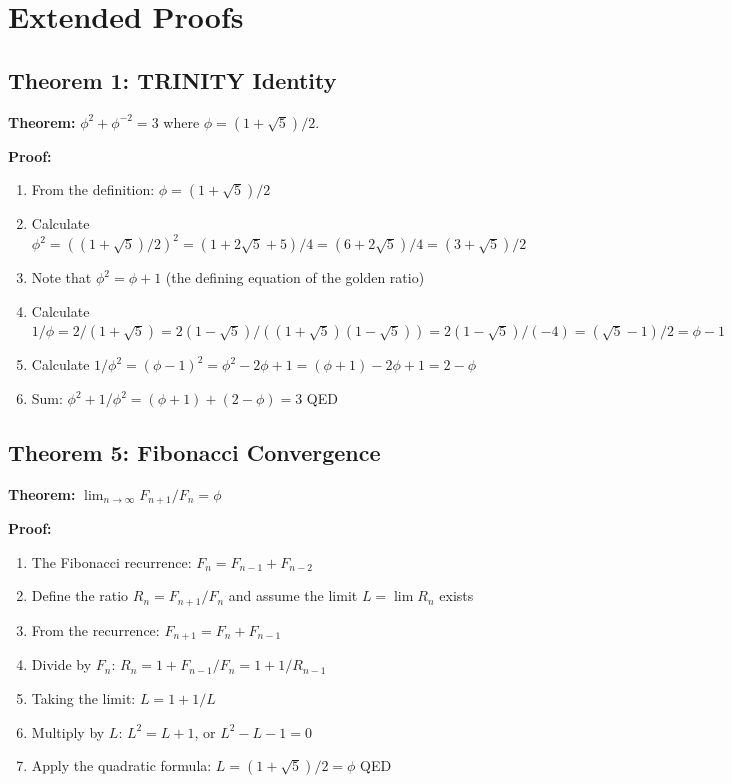 \documentclass[aps,prd,preprint,superscriptaddress,showpacs,nofootinbib,longbibliography]{revtex4-2}
\begin{document}
\section{Extended Proofs}
\label{app:proofs}

\subsection{Theorem 1: TRINITY Identity}

\textbf{Theorem:} $\phi^2 + \phi^{-2} = 3$ where $\phi = (1 + \sqrt{5})/2$.

\textbf{Proof:}
\begin{enumerate}
    \item From the definition: $\phi = (1 + \sqrt{5})/2$
    \item Calculate $\phi^2 = ((1 + \sqrt{5})/2)^2 = (1 + 2\sqrt{5} + 5)/4 = (6 + 2\sqrt{5})/4 = (3 + \sqrt{5})/2$
    \item Note that $\phi^2 = \phi + 1$ (the defining equation of the golden ratio)
    \item Calculate $1/\phi = 2/(1 + \sqrt{5}) = 2(1 - \sqrt{5})/((1 + \sqrt{5})(1 - \sqrt{5})) = 2(1 - \sqrt{5})/(-4) = (\sqrt{5} - 1)/2 = \phi - 1$
    \item Calculate $1/\phi^2 = (\phi - 1)^2 = \phi^2 - 2\phi + 1 = (\phi + 1) - 2\phi + 1 = 2 - \phi$
    \item Sum: $\phi^2 + 1/\phi^2 = (\phi + 1) + (2 - \phi) = 3$ \hfill QED
\end{enumerate}

\subsection{Theorem 5: Fibonacci Convergence}

\textbf{Theorem:} $\lim_{n \to \infty} F_{n+1}/F_n = \phi$

\textbf{Proof:}
\begin{enumerate}
    \item The Fibonacci recurrence: $F_n = F_{n-1} + F_{n-2}$
    \item Define the ratio $R_n = F_{n+1}/F_n$ and assume the limit $L = \lim R_n$ exists
    \item From the recurrence: $F_{n+1} = F_n + F_{n-1}$
    \item Divide by $F_n$: $R_n = 1 + F_{n-1}/F_n = 1 + 1/R_{n-1}$
    \item Taking the limit: $L = 1 + 1/L$
    \item Multiply by $L$: $L^2 = L + 1$, or $L^2 - L - 1 = 0$
    \item Apply the quadratic formula: $L = (1 + \sqrt{5})/2 = \phi$ \hfill QED
\end{enumerate}
\end{document}

